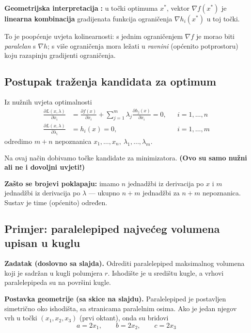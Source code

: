 \textbf{Geometrijska interpretacija} \textbf{:} u točki optimuma
$x^{*}$, vektor $\nabla f(x^{*})$ je \textbf{linearna kombinacija} gradijenata
funkcija ograničenja $\nabla h_i(x^{*})$ u toj točki.

To je poopćenje uvjeta kolinearnosti: s jednim ograničenjem $\nabla f$ je morao
biti \emph{paralelan} s $\nabla h$; s više ograničenja mora ležati u
\emph{ravnini} (općenito potprostoru) koju razapinju gradijenti ograničenja.

\subsection{Postupak traženja kandidata za optimum}

\begin{teorem}[Recept]
Iz nužnih uvjeta optimalnosti
\begin{align}
\frac{\partial L(x,\lambda)}{\partial x_i}
  &= \frac{\partial f(x)}{\partial x_i}
   + \sum_{j=1}^{m}\lambda_j\frac{\partial h_j(x)}{\partial x_i} = 0,
  && i = 1,\dots,n \\
\frac{\partial L(x,\lambda)}{\partial \lambda_i}
  &= h_i(x) = 0, && i = 1,\dots,m
\end{align}
odredimo $m + n$ nepoznanica $x_1,\dots,x_n,\ \lambda_1,\dots,\lambda_m$.

Na ovaj način dobivamo točke kandidate za minimizatora. \textbf{(Ovo su samo
nužni ali ne i dovoljni uvjeti!)}
\end{teorem}

\textbf{Zašto se brojevi poklapaju:} imamo $n$ jednadžbi iz derivacija po $x$ i
$m$ jednadžbi iz derivacija po $\lambda$ --- ukupno $n+m$ jednadžbi za $n+m$
nepoznanica. Sustav je time (općenito) određen.

\subsection{Primjer: paralelepiped najvećeg volumena upisan u kuglu}

\textbf{Zadatak (doslovno sa slajda).} Odrediti paralelepiped maksimalnog
volumena koji je sadržan u kugli polumjera $r$. Ishodište je u središtu kugle, a
vrhovi paralelepipeda su na površini kugle.

\textbf{Postavka geometrije (sa skice na slajdu).} Paralelepiped je postavljen
simetrično oko ishodišta, sa stranicama paralelnim osima. Ako je jedan njegov
vrh u točki $(x_1, x_2, x_3)$ (prvi oktant), onda su bridovi
\[
a = 2x_1, \qquad b = 2x_2, \qquad c = 2x_3
\]

